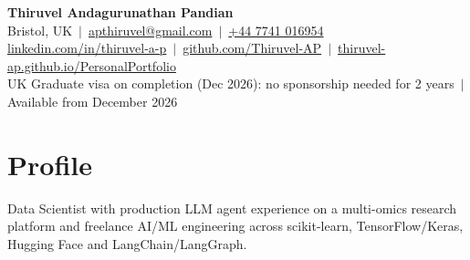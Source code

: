 \documentclass[a4paper,10pt]{article}
\begin{document}
\fontsize{10.5}{12.6}\selectfont

\begin{center}
  {\LARGE\bfseries Thiruvel Andagurunathan Pandian}\\[3pt]
  Bristol, UK \,$|$\, \href{mailto:apthiruvel@gmail.com}{apthiruvel@gmail.com} \,$|$\, \href{tel:+447741016954}{+44 7741 016954}\\[1pt]
\href{https://www.linkedin.com/in/thiruvel-a-p/}{linkedin.com/in/thiruvel-a-p} \,$|$\, \href{https://github.com/Thiruvel-AP}{github.com/Thiruvel-AP} \,$|$\, \href{https://thiruvel-ap.github.io/PersonalPortfolio/}{thiruvel-ap.github.io/PersonalPortfolio}\\[1pt]
  UK Graduate visa on completion (Dec 2026): no sponsorship needed for 2 years \,$|$\, Available from December 2026
\end{center}

\section{Profile}
Data Scientist with production LLM agent experience on a multi-omics research platform and freelance AI/ML engineering across scikit-learn, TensorFlow/Keras, Hugging Face and LangChain/LangGraph.

\end{document}
